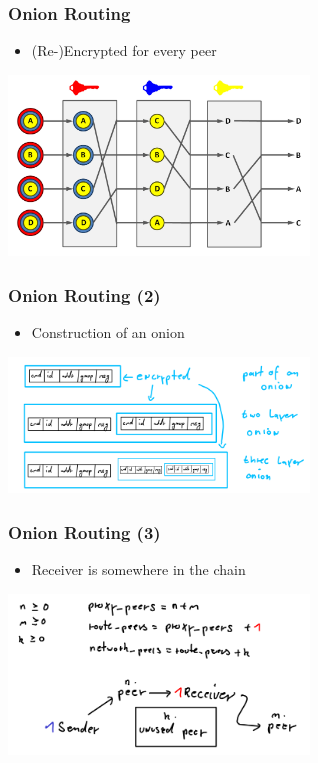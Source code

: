 \documentclass{beamer}
\begin{document}
\frame
{
  \frametitle{Onion Routing}
  \begin{itemize}
      \item (Re-)Encrypted for every peer
   \end{itemize}
  \begin{center}
   \includegraphics[width=8cm]{../Decryption_mix_net.png}
  \end{center}
}

\frame
{
  \frametitle{Onion Routing (2)}
  \begin{itemize}
      \item Construction of an onion
   \end{itemize}
  \begin{center}
   \includegraphics[width=8cm]{../onion.png}
  \end{center}
}

\frame
{
  \frametitle{Onion Routing (3)}
  \begin{itemize}
      \item Receiver is somewhere in the chain
   \end{itemize}
  \begin{center}
   \includegraphics[width=8cm]{../onionrouting.png}
  \end{center}
}
\end{document}
